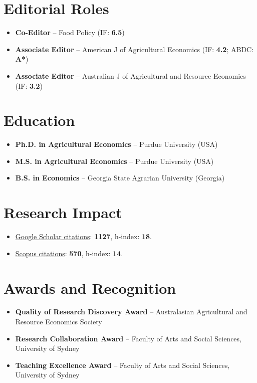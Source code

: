 \documentclass[10pt]{article}
\begin{document}
	\section*{Editorial Roles}
	\begin{itemize}
		\item {} \textbf{Co-Editor} -- Food Policy (IF: \textbf{6.5})
		\item {} \textbf{Associate Editor} -- American J of Agricultural Economics (IF: \textbf{4.2}; ABDC: \textbf{A*})
		\item {} \textbf{Associate Editor} -- Australian J of Agricultural and Resource Economics (IF: \textbf{3.2})
	\end{itemize}
	
	\section*{Education}
	\begin{itemize}
		\item {} \textbf{Ph.D. in Agricultural Economics} -- Purdue University (USA)
		\item {} \textbf{M.S. in Agricultural Economics} -- Purdue University (USA)
		\item {} \textbf{B.S. in Economics} -- Georgia State Agrarian University (Georgia)
	\end{itemize}
	
	\section*{Research Impact}
	\begin{itemize}
		\item \href{https://scholar.google.com/citations?user=VbNOr6wAAAAJ&hl=en}{Google Scholar citations}: \textbf{1127}, h-index: \textbf{18}.
		\item \href{https://www.scopus.com/authid/detail.uri?authorId=26421832000}{Scopus citations}: \textbf{570}, h-index: \textbf{14}.	
	\end{itemize}
	
	\section*{Awards and Recognition}
	\begin{itemize}
		\item {} \textbf{Quality of Research Discovery Award} -- Australasian Agricultural and Resource Economics Society
		\item {} \textbf{Research Collaboration Award} -- Faculty of Arts and Social Sciences, University of Sydney
		\item {} \textbf{Teaching Excellence Award} -- Faculty of Arts and Social Sciences, University of Sydney
	\end{itemize}
	
\end{document}
